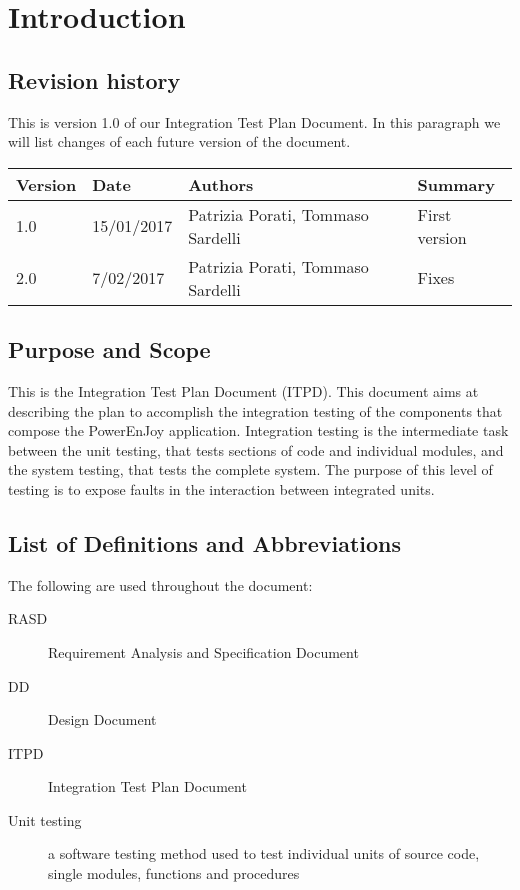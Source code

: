 \section{Introduction}

\subsection{Revision history}
This is version 1.0 of our Integration Test Plan Document.
In this paragraph we will list changes of each future version of the document. \\

\begin{tabular}{|l|l|l|l|}
	\hline
	\textbf{Version}	& \textbf{Date}	& \textbf{Authors}	& \textbf{Summary}\\
	\hline
	1.0					& 15/01/2017		& Patrizia Porati, Tommaso Sardelli	& First version\\
	\hline
	2.0					& 7/02/2017		& Patrizia Porati, Tommaso Sardelli	& Fixes\\
\hline
\end{tabular}

\subsection{Purpose and Scope}
This is the Integration Test Plan Document (ITPD). This document aims at describing the plan to accomplish the integration testing of the components that compose the PowerEnJoy application.
Integration testing is the intermediate task between the unit testing, that tests sections of code and individual modules, and the system testing, that tests the complete system.
The purpose of this level of testing is to expose faults in the interaction between integrated units.

\subsection{List of Definitions and Abbreviations}
The following are used throughout the document:
\begin{description}
	\item [RASD] Requirement Analysis and Specification Document
	\item [DD] Design Document
	\item [ITPD] Integration Test Plan Document
	\item [Unit testing] a software testing method used to test individual units of source code, single modules, functions and procedures
\end{description}

